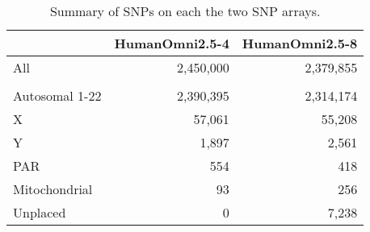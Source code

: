 \begin{table}[htp]
\centering
\begin{tabular}{l|rr}
\hline
               & HumanOmni2.5-4 & HumanOmni2.5-8 \\ \hline
All            & 2,450,000      & 2,379,855      \\ \hline
               &                &                \\
Autosomal 1-22 & 2,390,395      & 2,314,174      \\
X              & 57,061         & 55,208         \\
Y              & 1,897          & 2,561          \\
PAR            & 554            & 418            \\
Mitochondrial  & 93             & 256            \\
Unplaced       & 0              & 7,238          \\ \hline
\end{tabular}
\caption{Summary of SNPs on each the two SNP arrays.}
\label{tab:chips_preQC_summary}
\end{table}